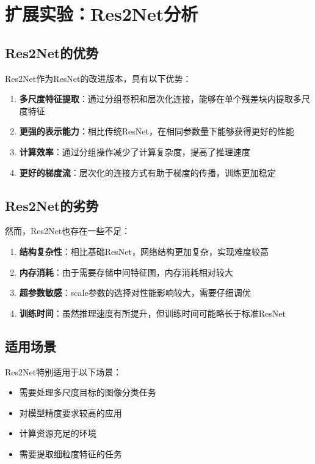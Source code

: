 \documentclass[12pt,a4paper]{article}
\begin{document}
\section{扩展实验：Res2Net分析}
\subsection{Res2Net的优势}
Res2Net作为ResNet的改进版本，具有以下优势：

\begin{enumerate}
    \item \textbf{多尺度特征提取}：通过分组卷积和层次化连接，能够在单个残差块内提取多尺度特征
    \item \textbf{更强的表示能力}：相比传统ResNet，在相同参数量下能够获得更好的性能
    \item \textbf{计算效率}：通过分组操作减少了计算复杂度，提高了推理速度
    \item \textbf{更好的梯度流}：层次化的连接方式有助于梯度的传播，训练更加稳定
\end{enumerate}

\subsection{Res2Net的劣势}
然而，Res2Net也存在一些不足：

\begin{enumerate}
    \item \textbf{结构复杂性}：相比基础ResNet，网络结构更加复杂，实现难度较高
    \item \textbf{内存消耗}：由于需要存储中间特征图，内存消耗相对较大
    \item \textbf{超参数敏感}：scale参数的选择对性能影响较大，需要仔细调优
    \item \textbf{训练时间}：虽然推理速度有所提升，但训练时间可能略长于标准ResNet
\end{enumerate}

\subsection{适用场景}
Res2Net特别适用于以下场景：
\begin{itemize}
    \item 需要处理多尺度目标的图像分类任务
    \item 对模型精度要求较高的应用
    \item 计算资源充足的环境
    \item 需要提取细粒度特征的任务
\end{itemize}
\end{document}
